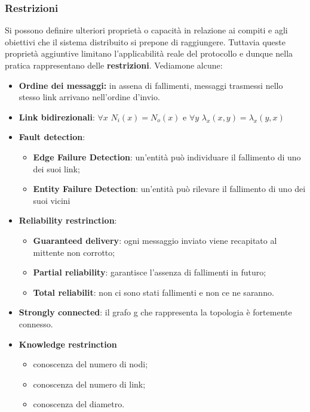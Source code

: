 \documentclass[12pt]{article}
\begin{document}
		\subsubsection{Restrizioni}
			Si possono definire ulteriori proprietà o capacità in relazione ai compiti e agli obiettivi che il sistema distribuito si prepone di raggiungere. Tuttavia queste proprietà aggiuntive  limitano l'applicabilità reale del protocollo e dunque nella pratica rappresentano delle \textbf{restrizioni}. Vediamone alcune:
			\begin{itemize}
				\item \textbf{Ordine dei messaggi:} in assena di fallimenti, messaggi trasmessi nello stesso link arrivano nell'ordine d'invio.
				\item \textbf{Link bidirezionali}: $\forall x$ $N_{i}(x)=N_{o}(x)$ e $\forall y$ $\lambda_{x}(x,y) = \lambda_{x}(y,x	)$ 
				\item \textbf{Fault detection}:
				\begin{itemize}
					\item \textbf{Edge Failure Detection}: un'entità può individuare il fallimento di uno dei suoi link;
					\item \textbf{Entity Failure Detection}: un'entità può rilevare il fallimento di uno dei suoi vicini 	
				\end{itemize} 
				\item \textbf{Reliability restrinction}: 
				\begin{itemize}
					\item \textbf{Guaranteed delivery}: ogni messaggio inviato viene recapitato al mittente non corrotto;
					\item \textbf{Partial reliability}: garantisce l'assenza di fallimenti in futuro;
					\item \textbf{Total reliabilit}: non ci sono stati fallimenti e non ce ne saranno.
				\end{itemize} 
				\item \textbf{Strongly connected}: il grafo g che rappresenta la topologia è fortemente connesso.
				\item \textbf{Knowledge restrinction}
				\begin{itemize}
					\item conoscenza del numero di nodi;
					\item conoscenza del numero di link;
					\item conoscenza del diametro.
				\end{itemize}
			\end{itemize}
		
\end{document}
